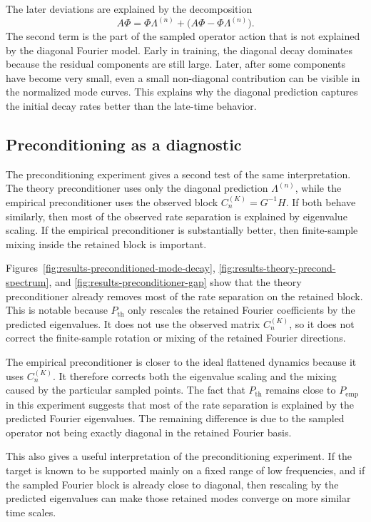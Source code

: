 The later deviations are explained by the decomposition
\[
	A\Phi
	=
	\Phi\Lambda^{(n)}
	+
	\bigl(A\Phi-\Phi\Lambda^{(n)}\bigr).
\]
The second term is the part of the sampled operator action that is not explained
by the diagonal Fourier model. Early in training, the diagonal decay dominates
because the residual components are still large. Later, after some components
have become very small, even a small non-diagonal contribution can be visible in
the normalized mode curves. This explains why the diagonal prediction captures
the initial decay rates better than the late-time behavior.

\subsection{Preconditioning as a diagnostic}
\label{subsec:discussion-q1-preconditioning}

The preconditioning experiment gives a second test of the same interpretation.
The theory preconditioner uses only the diagonal prediction
\(\Lambda^{(n)}\), while the empirical preconditioner uses the observed block
\(C_n^{(K)}=G^{-1}H\). If both behave similarly, then most of the observed rate
separation is explained by eigenvalue scaling. If the empirical preconditioner
is substantially better, then finite-sample mixing inside the retained block is
important.

Figures~\ref{fig:results-preconditioned-mode-decay},
\ref{fig:results-theory-precond-spectrum}, and
\ref{fig:results-preconditioner-gap} show that the theory preconditioner already
removes most of the rate separation on the retained block. This is notable
because \(P_{\mathrm{th}}\) only rescales the retained Fourier coefficients by
the predicted eigenvalues. It does not use the observed matrix \(C_n^{(K)}\), so
it does not correct the finite-sample rotation or mixing of the retained
Fourier directions.

The empirical preconditioner is closer to the ideal flattened dynamics because
it uses \(C_n^{(K)}\). It therefore corrects both the eigenvalue scaling and the
mixing caused by the particular sampled points. The fact that
\(P_{\mathrm{th}}\) remains close to \(P_{\mathrm{emp}}\) in this experiment
suggests that most of the rate separation is explained by the predicted
Fourier eigenvalues. The remaining difference is due to the sampled operator not
being exactly diagonal in the retained Fourier basis.

This also gives a useful interpretation of the preconditioning experiment. If
the target is known to be supported mainly on a fixed range of low frequencies,
and if the sampled Fourier block is already close to diagonal, then rescaling by
the predicted eigenvalues can make those retained modes converge on more similar
time scales.

